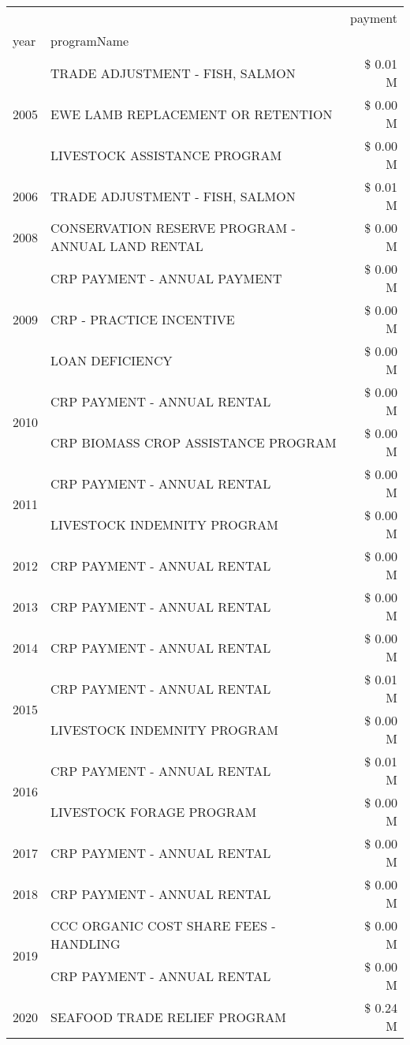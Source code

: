 \begin{tabular}{llr}
\toprule
 &  & payment \\
year & programName &  \\
\midrule
\multirow[t]{3}{*}{2005} & TRADE ADJUSTMENT - FISH, SALMON & \$ 0.01 M \\
 & EWE LAMB REPLACEMENT OR RETENTION & \$ 0.00 M \\
 & LIVESTOCK ASSISTANCE PROGRAM & \$ 0.00 M \\
\cline{1-3}
2006 & TRADE ADJUSTMENT - FISH, SALMON & \$ 0.01 M \\
\cline{1-3}
2008 & CONSERVATION RESERVE PROGRAM - ANNUAL LAND RENTAL & \$ 0.00 M \\
\cline{1-3}
\multirow[t]{3}{*}{2009} & CRP PAYMENT - ANNUAL PAYMENT & \$ 0.00 M \\
 & CRP - PRACTICE INCENTIVE & \$ 0.00 M \\
 & LOAN DEFICIENCY & \$ 0.00 M \\
\cline{1-3}
\multirow[t]{2}{*}{2010} & CRP PAYMENT - ANNUAL RENTAL & \$ 0.00 M \\
 & CRP BIOMASS CROP ASSISTANCE PROGRAM & \$ 0.00 M \\
\cline{1-3}
\multirow[t]{2}{*}{2011} & CRP PAYMENT - ANNUAL RENTAL & \$ 0.00 M \\
 & LIVESTOCK INDEMNITY PROGRAM & \$ 0.00 M \\
\cline{1-3}
2012 & CRP PAYMENT - ANNUAL RENTAL & \$ 0.00 M \\
\cline{1-3}
2013 & CRP PAYMENT - ANNUAL RENTAL & \$ 0.00 M \\
\cline{1-3}
2014 & CRP PAYMENT - ANNUAL RENTAL & \$ 0.00 M \\
\cline{1-3}
\multirow[t]{2}{*}{2015} & CRP PAYMENT - ANNUAL RENTAL & \$ 0.01 M \\
 & LIVESTOCK INDEMNITY PROGRAM & \$ 0.00 M \\
\cline{1-3}
\multirow[t]{2}{*}{2016} & CRP PAYMENT - ANNUAL RENTAL & \$ 0.01 M \\
 & LIVESTOCK FORAGE PROGRAM & \$ 0.00 M \\
\cline{1-3}
2017 & CRP PAYMENT - ANNUAL RENTAL & \$ 0.00 M \\
\cline{1-3}
2018 & CRP PAYMENT - ANNUAL RENTAL & \$ 0.00 M \\
\cline{1-3}
\multirow[t]{2}{*}{2019} & CCC ORGANIC COST SHARE FEES - HANDLING & \$ 0.00 M \\
 & CRP PAYMENT - ANNUAL RENTAL & \$ 0.00 M \\
\cline{1-3}
\multirow[t]{3}{*}{2020} & SEAFOOD TRADE RELIEF PROGRAM & \$ 0.24 M \\

\end{tabular}

